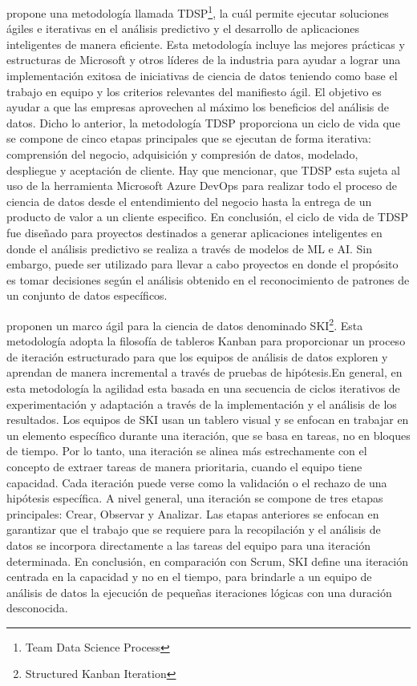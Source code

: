 \cite{Microsoft2022} propone una metodología llamada TDSP\footnote{Team Data Science Process}, la cuál permite ejecutar soluciones ágiles e iterativas en el análisis predictivo y el desarrollo de aplicaciones inteligentes de manera eficiente. Esta metodología incluye las mejores prácticas y estructuras de Microsoft y otros líderes de la industria para ayudar a lograr una implementación exitosa de iniciativas de ciencia de datos teniendo como base el trabajo en equipo y los criterios relevantes del manifiesto ágil. El objetivo es ayudar a que las empresas aprovechen al máximo los beneficios del análisis de datos. Dicho lo anterior, la metodología TDSP proporciona un ciclo de vida que se compone de cinco etapas principales que se ejecutan de forma iterativa: comprensión del negocio, adquisición y compresión de datos, modelado, despliegue y aceptación de cliente. Hay que mencionar, que TDSP esta sujeta al uso de la herramienta Microsoft Azure DevOps para realizar todo el proceso de ciencia de datos desde el entendimiento del negocio hasta la entrega de un producto de valor a un cliente especifico. En conclusión, el ciclo de vida de TDSP fue diseñado para proyectos destinados a generar aplicaciones inteligentes en donde el análisis predictivo se realiza a través de modelos de ML e AI. Sin embargo, puede ser utilizado para llevar a cabo proyectos en donde el propósito es tomar decisiones según el análisis obtenido en el reconocimiento de patrones de un conjunto de datos específicos.

\cite{Saltz2019} proponen un marco ágil para la ciencia de datos denominado SKI\footnote{Structured Kanban Iteration}. Esta metodología adopta la filosofía de tableros Kanban  para proporcionar un proceso de iteración estructurado para que los equipos de análisis de datos exploren y aprendan de manera incremental a través de pruebas de hipótesis.En general, en esta metodología la agilidad esta basada en una secuencia de ciclos iterativos de experimentación y adaptación a través de la implementación y el análisis de los resultados. Los equipos de SKI usan un tablero visual y se enfocan en trabajar en un elemento específico durante una iteración, que se basa en tareas, no en bloques de tiempo. Por lo tanto, una iteración se alinea más estrechamente con el concepto de extraer tareas de manera prioritaria, cuando el equipo tiene capacidad. Cada iteración puede verse como la validación o el rechazo de una hipótesis específica. A nivel general, una iteración se compone de tres etapas principales: Crear, Observar y Analizar. Las etapas anteriores se enfocan en garantizar que el trabajo que se requiere para la recopilación y el análisis de datos se incorpora directamente a las tareas del equipo para una iteración determinada. En conclusión, en comparación con Scrum, SKI define una iteración centrada en la capacidad y no en el tiempo, para brindarle a un equipo de análisis de datos la ejecución de pequeñas iteraciones lógicas con una duración desconocida.

